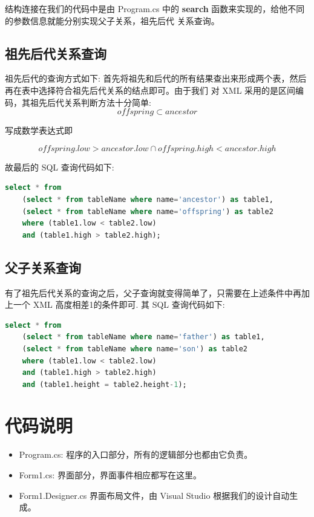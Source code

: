 \documentclass[10pt]{article}
\begin{document}
\begin{CJK}{UTF8}{gbsn}
结构连接在我们的代码中是由 Program.cs 中的 \textbf{search} 函数来实现的，给他不同的参数信息就能分别实现父子关系，祖先后代
关系查询。

\subsection{祖先后代关系查询}
祖先后代的查询方式如下: 首先将祖先和后代的所有结果查出来形成两个表，然后再在表中选择符合祖先后代关系的结点即可。由于我们
对 XML 采用的是区间编码，其祖先后代关系判断方法十分简单:\\

$$offspring \subset ancestor$$

写成数学表达式即 

$$offspring.low > ancestor.low \cap offspring.high < ancestor.high$$

故最后的 SQL 查询代码如下:\\
\begin{lstlisting}[language=sql,tabsize=2]
select * from 
	(select * from tableName where name='ancestor') as table1, 
	(select * from tableName where name='offspring') as table2 
	where (table1.low < table2.low) 
	and (table1.high > table2.high);
\end{lstlisting}

\subsection{父子关系查询}
有了祖先后代关系的查询之后，父子查询就变得简单了，只需要在上述条件中再加上一个 XML 高度相差1的条件即可.
其 SQL 查询代码如下:\\
\begin{lstlisting}[language=sql,tabsize=2]
select * from 
	(select * from tableName where name='father') as table1, 
	(select * from tableName where name='son') as table2 
	where (table1.low < table2.low) 
	and (table1.high > table2.high) 
	and (table1.height = table2.height-1);
\end{lstlisting}

\section{代码说明}
\begin{itemize}
\item Program.cs: 程序的入口部分，所有的逻辑部分也都由它负责。
\item Form1.cs: 界面部分，界面事件相应都写在这里。
\item Form1.Designer.cs 界面布局文件，由 Visual Studio 根据我们的设计自动生成。
\end{itemize}


\end{CJK}
\end{document}
